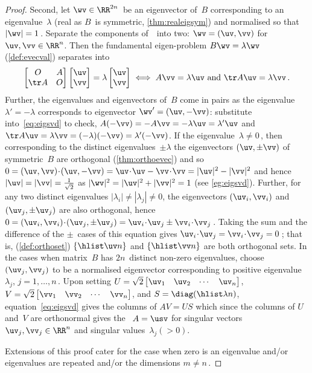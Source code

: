\begin{proof}
Second, let \(\wv\in\RR^{2n}\)\ be an eigenvector of~\(B\) corresponding to an eigenvalue~\(\lambda\) (real as \(B\)~is symmetric, \autoref{thm:realeigsym}) and normalised so that \(|\wv|=1\)\,.
Separate the components of~\wv\ into two: \(\wv=(\uv,\vv)\) for \(\uv,\vv\in\RR^n\).
Then the fundamental eigen-problem \(B\wv=\lambda\wv\)  (\autoref{def:evecval}) separates into
\begin{equation}
\begin{bmatrix} O& A\\\tr A&O \end{bmatrix}\begin{bmatrix} \uv\\\vv \end{bmatrix}=\lambda\begin{bmatrix} \uv\\\vv \end{bmatrix}
\iff  A\vv=\lambda\uv \text{ and }\tr A\uv=\lambda\vv\,.
\label{eq:eigsvd}
\end{equation}
Further, the eigenvalues and eigenvectors of~\(B\) come in pairs as  the eigenvalue \(\lambda'=-\lambda\) corresponds to eigenvector \(\wv'=(\uv,-\vv)\): substitute into~\eqref{eq:eigsvd} to check, \(A(-\vv)=-A\vv=-\lambda\uv=\lambda'\uv\) and \(\tr A\uv=\lambda\vv=(-\lambda)(-\vv)=\lambda'(-\vv)\).
If the eigenvalue~\(\lambda\neq0\)\,, then corresponding to the distinct eigenvalues~\(\pm\lambda\) the eigenvectors \((\uv,\pm\vv)\) of symmetric~\(B\) are orthogonal (\autoref{thm:orthoevec}) and so \(0=(\uv,\vv)\cdot(\uv,-\vv)=\uv\cdot\uv-\vv\cdot\vv=|\uv|^2-|\vv|^2\) and hence \(|\uv|=|\vv|=\frac1{\sqrt2}\) as \(|\wv|^2=|\uv|^2+|\vv|^2=1\) (see \autoref{eg:eigsvd}).
Further, for any two distinct eigenvalues \(|\lambda_i|\neq|\lambda_j|\neq 0\), the eigenvectors \((\uv_i,\vv_i)\) and \((\uv_j,\pm\uv_j)\) are also orthogonal, hence \(0 =(\uv_i,\vv_i)\cdot(\uv_j,\pm\uv_j) =\uv_i\cdot\uv_j \pm\vv_i\cdot\vv_j\)\,.
Taking the sum and the difference of the \(\pm\)~cases of this equation gives \(\uv_i\cdot\uv_j=\vv_i\cdot\vv_j=0\)\,; that is,  (\autoref{def:orthoset}) \(\{\hlist\uv n\}\) and \(\{\hlist\vv n\}\) are both orthogonal sets.
In the cases when matrix~\(B\) has \(2n\)~distinct non-zero eigenvalues, choose \((\uv_j,\vv_j)\) to be a normalised eigenvector corresponding to positive eigenvalue~\(\lambda_j\), \(j=1,\ldots,n\)\,. 
Upon setting \(U=\sqrt2\begin{bmatrix} \uv_1&\uv_2&\cdots&\uv_n \end{bmatrix}\), \(V=\sqrt2\begin{bmatrix} \vv_1&\vv_2&\cdots&\vv_n \end{bmatrix}\), and \(S=\diag(\hlist\lambda n)\), equation~\eqref{eq:eigsvd} gives the columns of \(AV=US\) which since the columns of \(U\) and~\(V\) are orthonormal gives the \svd\ \(A=\usv\) for singular vectors \(\uv_j,\vv_j\in\RR^n\) and singular values~\(\lambda_j(>0)\).

Extensions of this proof cater for the case when zero is an eigenvalue and/or eigenvalues are repeated and/or the dimensions \(m\neq n\)\,.
\end{proof}
